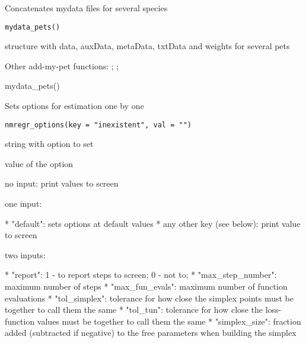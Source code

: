 \documentclass[a4paper]{book}
\begin{document}
%
\begin{Description}\relax
Concatenates mydata files for several species
\end{Description}
%
\begin{Usage}
\begin{verbatim}
mydata_pets()
\end{verbatim}
\end{Usage}
%
\begin{Value}
structure with data, auxData, metaData, txtData and weights for several pets
\end{Value}
%
\begin{SeeAlso}\relax
Other add-my-pet functions: ;
; 
\end{SeeAlso}
%
\begin{Examples}
\begin{ExampleCode}
mydata_pets()
\end{ExampleCode}
\end{Examples}
%
\begin{Description}\relax
Sets options for estimation one by one
\end{Description}
%
\begin{Usage}
\begin{verbatim}
nmregr_options(key = "inexistent", val = "")
\end{verbatim}
\end{Usage}
%
\begin{Arguments}
\begin{ldescription}
\item[\code{key}] string with option to set

\item[\code{val}] value of the option
\end{ldescription}
\end{Arguments}
%
\begin{Details}\relax
no input: print values to screen

one input:

* "default": sets options at default values
* any other key (see below): print value to screen

two inputs:

* "report": 1 - to report steps to screen; 0 - not to;
* "max\_step\_number": maximum number of steps
* "max\_fun\_evals": maximum number of function evaluations
* "tol\_simplex": tolerance for how close the simplex points must be together to call them the same
* "tol\_tun": tolerance for how close the loss-function values must be together to call them the same
* "simplex\_size": fraction added (subtracted if negative) to the free parameters when building the simplex
\end{Details}
\end{document}

